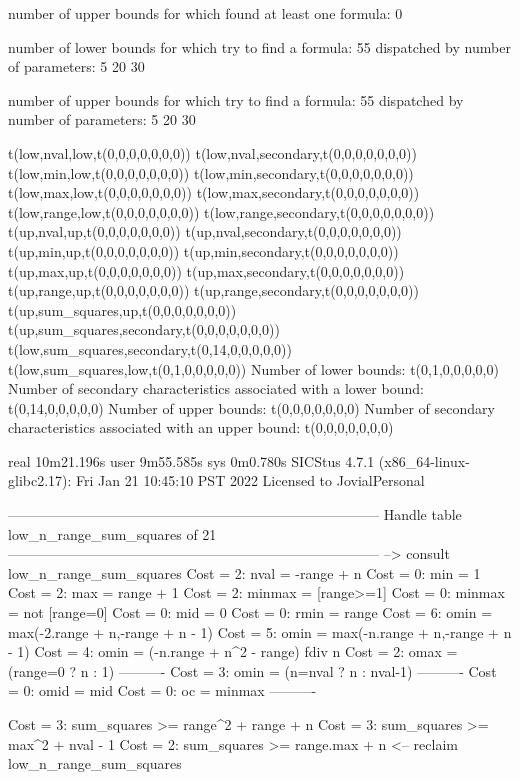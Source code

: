 number of upper bounds for which found at least one formula: 0

number of lower bounds for which try to find a formula: 55
dispatched by number of parameters: 5  20  30

number of upper bounds for which try to find a formula: 55
dispatched by number of parameters: 5  20  30

t(low,nval,low,t(0,0,0,0,0,0,0))
t(low,nval,secondary,t(0,0,0,0,0,0,0))
t(low,min,low,t(0,0,0,0,0,0,0))
t(low,min,secondary,t(0,0,0,0,0,0,0))
t(low,max,low,t(0,0,0,0,0,0,0))
t(low,max,secondary,t(0,0,0,0,0,0,0))
t(low,range,low,t(0,0,0,0,0,0,0))
t(low,range,secondary,t(0,0,0,0,0,0,0))
t(up,nval,up,t(0,0,0,0,0,0,0))
t(up,nval,secondary,t(0,0,0,0,0,0,0))
t(up,min,up,t(0,0,0,0,0,0,0))
t(up,min,secondary,t(0,0,0,0,0,0,0))
t(up,max,up,t(0,0,0,0,0,0,0))
t(up,max,secondary,t(0,0,0,0,0,0,0))
t(up,range,up,t(0,0,0,0,0,0,0))
t(up,range,secondary,t(0,0,0,0,0,0,0))
t(up,sum_squares,up,t(0,0,0,0,0,0,0))
t(up,sum_squares,secondary,t(0,0,0,0,0,0,0))
t(low,sum_squares,secondary,t(0,14,0,0,0,0,0))
t(low,sum_squares,low,t(0,1,0,0,0,0,0))
Number of lower bounds:                                             t(0,1,0,0,0,0,0)
Number of secondary characteristics associated with a lower bound:  t(0,14,0,0,0,0,0)
Number of upper bounds:                                             t(0,0,0,0,0,0,0)
Number of secondary characteristics associated with an upper bound: t(0,0,0,0,0,0,0)

real	10m21.196s
user	9m55.585s
sys	0m0.780s
SICStus 4.7.1 (x86_64-linux-glibc2.17): Fri Jan 21 10:45:10 PST 2022
Licensed to JovialPersonal


--------------------------------------------------------------------------------
Handle table low_n_range_sum_squares of 21
--------------------------------------------------------------------------------
--> consult low_n_range_sum_squares
Cost =  2:  nval   = -range + n
Cost =  0:  min    = 1
Cost =  2:  max    = range + 1
Cost =  2:  minmax = [range>=1]
Cost =  0:  minmax = not [range=0]
Cost =  0:  mid    = 0
Cost =  0:  rmin   = range
Cost =  6:  omin   = max(-2.range + n,-range + n - 1)
Cost =  5:  omin   = max(-n.range + n,-range + n - 1)
Cost =  4:  omin   = (-n.range + n^2 - range) fdiv n
Cost =  2:  omax   = (range=0 ? n : 1)
----------
Cost =  3:  omin   = (n=nval ? n : nval-1)
----------
Cost =  0:  omid   = mid
Cost =  0:  oc     = minmax
----------

Cost =  3:  sum_squares >= range^2 + range + n
Cost =  3:  sum_squares >= max^2 + nval - 1
Cost =  2:  sum_squares >= range.max + n
<-- reclaim low_n_range_sum_squares

